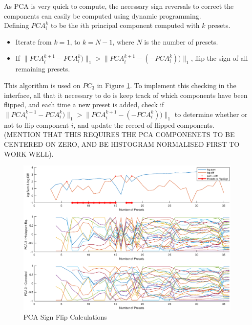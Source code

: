 \documentclass[11pt, oneside]{report}   	%
\begin{document}
As PCA is very quick to compute, the necessary sign reversals to correct the components can easily be computed using dynamic programming.\\ Defining $PCA_i^k$ to be the $i$th principal component computed with $k$ presets.
\vspace{-10pt}
\begin{itemize}
		\setlength\itemsep{-1.2em}
	\item 
Iterate from $k = 1$, to $k = N-1$, where $N$ is the number of presets.
	\item 
If $\|PCA_i^{k+1} - PCA_i^k)\|_1 > \|PCA_i^{k+1} - (-PCA_i^k))\|_1$,  flip the sign of all remaining presets.
\end{itemize}
This algorithm is used on $PC_3$ in Figure \ref{fig:PCAnumPresets2}. To implement this checking in the interface, all that it necessary to do is keep track of which components have been flipped, and each time a new preset is added, check if $\|PCA_i^{k+1} - PCA_i^k)\|_1 > \|PCA_i^{k+1} - (-PCA_i^k))\|_1$ to determine whether or not to flip component $i$, and update the record of flipped components. (MENTION THAT THIS REQUIRES THE PCA COMPONENETS TO BE CENTERED ON ZERO, AND BE HISTOGRAM NORMALISED FIRST TO WORK WELL).
\begin{figure}
	\hspace{-40pt}
	\includegraphics[width = 7in]{PCAnumPresets2.eps}
	\caption{PCA Sign Flip Calculations}
	\label{fig:PCAnumPresets2}
\end{figure}
\end{document}
